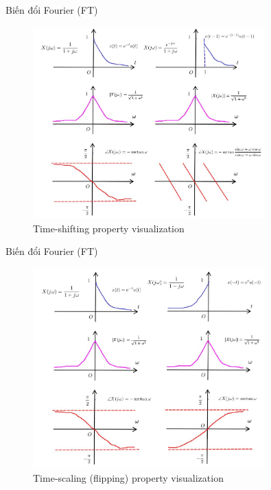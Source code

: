 \documentclass[8pt]{beamer}
\begin{document}
\begin{frame}{Biến đổi Fourier (FT)}
\begin{figure}[h]
			\includegraphics[width=0.8\textwidth]{spectrum.jpg}
			\caption{Time-shifting property visualization}\label{fig:re11}

		\end{figure}

\end{frame}
\begin{frame}{Biến đổi Fourier (FT)}
\begin{figure}[h]
			\includegraphics[width=0.8\textwidth]{spec.jpg}
			\caption{Time-scaling (flipping) property visualization}\label{fig:re11}

		\end{figure}

\end{frame}
\end{document}
